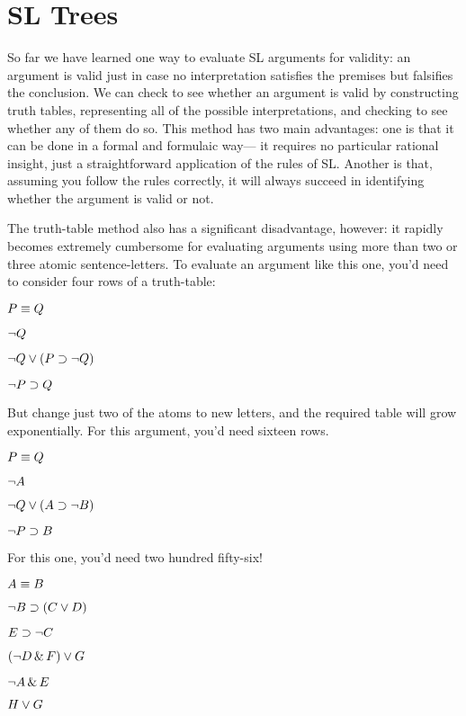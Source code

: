 \chapter{SL Trees}
\label{ch.sl.trees}

So far we have learned one way to evaluate SL arguments for validity: an argument is valid just in case no interpretation satisfies the premises but falsifies the conclusion. We can check to see whether an argument is valid by constructing truth tables, representing all of the possible interpretations, and checking to see whether any of them do so. This method has two main advantages: one is that it can be done in a formal and formulaic way--- it requires no particular rational insight, just a straightforward application of the rules of SL. Another is that, assuming you follow the rules correctly, it will always succeed in identifying whether the argument is valid or not.

The truth-table method also has a significant disadvantage, however: it rapidly becomes extremely cumbersome for evaluating arguments using more than two or three atomic sentence-letters. To evaluate an argument like this one, you'd need to consider four rows of a truth-table:

\begin{earg}
\item[] $P\equiv Q$
\item[] $\neg Q$
\item[] $\neg Q \vee (P \supset \neg Q)$
\item[\therefore] $\neg P \supset Q$
\end{earg}

But change just two of the atoms to new letters, and the required table will grow exponentially. For this argument, you'd need sixteen rows.

\begin{earg}
\item[] $P\equiv Q$
\item[] $\neg A$
\item[] $\neg Q \vee (A \supset \neg B)$
\item[\therefore] $\neg P \supset B$
\end{earg}

For this one, you'd need two hundred fifty-six!
\label{8letterargument}
\begin{earg}
\item[] $A\equiv B$
\item[] $\neg B \supset (C \vee D)$
\item[] $E \supset \neg C$
\item[] $(\neg D \,\&\, F) \vee G$
\item[] $\neg A \,\&\, E$
\item[\therefore] $H \vee G$
\end{earg}

